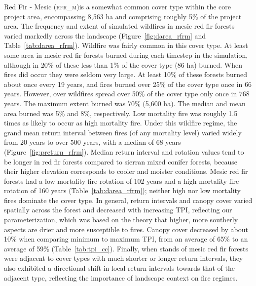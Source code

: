 Red Fir - Mesic (\textsc{rfr\_m})is a somewhat common cover type within the core project area, encompassing 8,563 ha and comprising roughly 5\% of the project area. The frequency and extent of simulated wildfires in mesic red fir forests varied markedly across the landscape (Figure~\ref{fig:darea_rfrm} and Table~\ref{tab:darea_rfrm}). %
%
Wildfire was fairly common in this cover type. At least some area in mesic red fir forests burned during each timestep in the simulation, although in 20\% of these less than 1\% of the cover type (86 ha) burned. When fires did occur they were seldom very large. At least 10\% of these forests burned about once every 19 years, and fires burned over 25\% of the cover type once in 66 years. However, over wildfires spread over 50\% of the cover type only once in 768 years. The maximum extent burned was 70\% (5,600 ha). The median and mean area burned was 5\% and 8\%, respectively. Low mortality fire was roughly 1.5 times as likely to occur as high mortality fire. %
%
Under this wildfire regime, the grand mean return interval between fires (of any mortality level) varied widely from 20 years to over 500 years, with a median of 68 years (Figure~\ref{fig:preturn_rfrm}). Median return interval and rotation values tend to be longer in red fir forests compared to sierran mixed conifer forests, because their higher elevation corresponds to cooler and moister conditions. Mesic red fir forests had a low mortality fire rotation of 102 years and a high mortality fire rotation of 160 years (Table~\ref{tab:darea_rfrm}); neither high nor low mortality fires dominate the cover type.  %
%
In general, return intervals and canopy cover varied spatially across the forest and decreased with increasing TPI, reflecting our parameterization, which was based on the theory that higher, more southerly aspects are drier and more susceptible to fires. Canopy cover decreased by about 10\% when comparing minimum to maximum TPI, from an average of 65\% to an average of 59\% (Table~\ref{tab:tpi_cc}).  %
%
Finally, when stands of mesic red fir forests were adjacent to cover types with much shorter or longer return intervals, they also exhibited a directional shift in local return intervals towards that of the adjacent type, reflecting the importance of landscape context on fire regimes.

